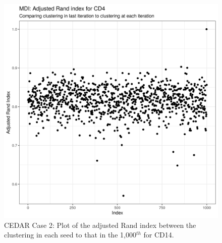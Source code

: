 \documentclass[12pt]{article} %
\begin{document}
	\begin{figure}[h]
		\centering
		\includegraphics[scale=0.75]{Images/Biology_data/Set_1000/All_datasets/Adjusted_rand_index_plots/rand_index_plot_CD4.png}
		\caption{CEDAR Case 2: Plot of the adjusted Rand index between the clustering in each seed to that in the 1,000$^{th}$ for CD14.}
		\label{fig:results:cedar_2:mdi_cd4_adj_rand_ind_plot}
	\end{figure}
	
	
\end{document}

